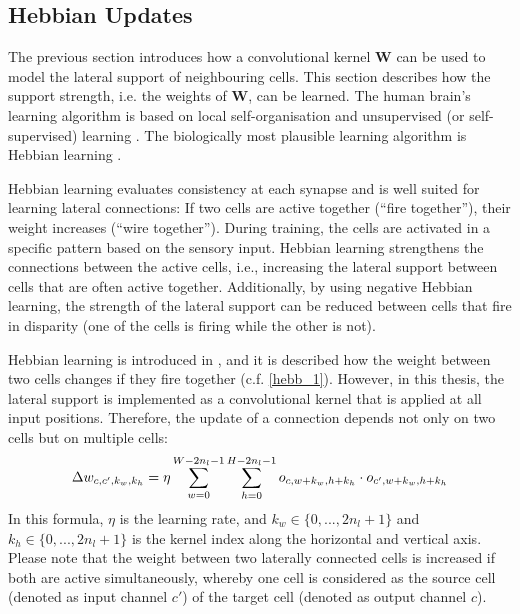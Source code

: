 \subsection{Hebbian Updates}
The previous section introduces how a convolutional kernel $\boldsymbol{W}$ can be used to model the lateral support of neighbouring cells.
This section describes how the support strength, i.e. the weights of $\boldsymbol{W}$, can be learned.
The human brain's learning algorithm is based on local self-organisation and unsupervised (or self-supervised) learning . The biologically most plausible learning algorithm is Hebbian learning .

Hebbian learning evaluates consistency at each synapse and is well suited for learning lateral connections: If two cells are active together (``fire together''), their weight increases (``wire together''). During training, the cells are activated in a specific pattern based on the sensory input. Hebbian learning strengthens the connections between the active cells, i.e., increasing the lateral support between cells that are often active together. Additionally, by using negative Hebbian learning, the strength of the lateral support can be reduced between cells that fire in disparity (one of the cells is firing while the other is not).

Hebbian learning is introduced in , and it is described how the weight between two cells changes if they fire together (c.f. \eqref{hebb_1}).
However, in this thesis, the lateral support is implemented as a convolutional kernel that is applied at all input positions.
Therefore, the update of a connection depends not only on two cells but on multiple cells:
%
\begin{align}\eqlbl{hebbu_1}
	\Delta w_{c, c',k_w,k_h} = \eta \sum_{w = 0}^{W - 2n_l - 1} \sum_{h = 0}^{H - 2n_l - 1} o_{c,w+k_w,h+k_h} \cdot o_{c',w+k_w,h+k_h}
\end{align}
%
In this formula, $\eta$ is the learning rate, and $k_w \in \{0, ..., 2n_l+1\}$ and $k_h\in \{0, ..., 2n_l+1 \}$ is the kernel index along the horizontal and vertical axis.
Please note that the weight between two laterally connected cells is increased if both are active simultaneously, whereby one cell is considered as the source cell (denoted as input channel $c'$) of the target cell (denoted as output channel $c$).

